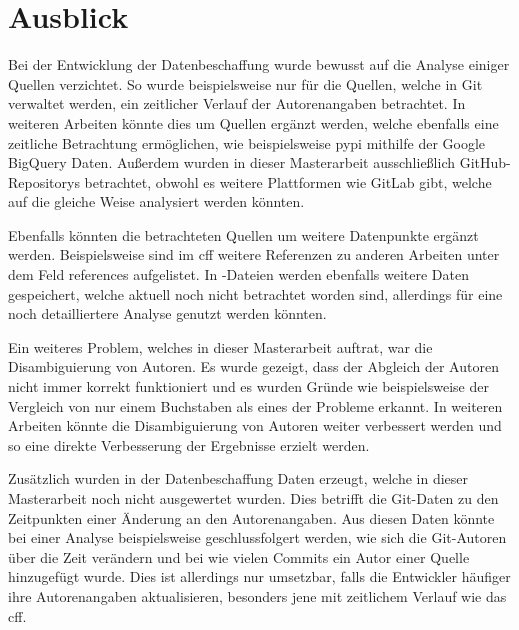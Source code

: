 \section{Ausblick}
\label{sec:ausblick}
Bei der Entwicklung der Datenbeschaffung wurde bewusst auf die Analyse einiger Quellen verzichtet.
So wurde beispielsweise nur für die Quellen, welche in Git verwaltet werden, ein zeitlicher Verlauf der Autorenangaben betrachtet.
In weiteren Arbeiten könnte dies um Quellen ergänzt werden, welche ebenfalls eine zeitliche Betrachtung ermöglichen, wie beispielsweise \gls{pypi} mithilfe der Google BigQuery Daten.
Außerdem wurden in dieser Masterarbeit ausschließlich GitHub-Repositorys betrachtet, obwohl es weitere Plattformen wie GitLab gibt, welche auf die gleiche Weise analysiert werden könnten.

Ebenfalls könnten die betrachteten Quellen um weitere Datenpunkte ergänzt werden.
Beispielsweise sind im \gls{cff} weitere Referenzen zu anderen Arbeiten unter dem Feld \glqq references\grqq{} aufgelistet.
In -Dateien werden ebenfalls weitere Daten gespeichert, welche aktuell noch nicht betrachtet worden sind, allerdings für eine noch detailliertere Analyse genutzt werden könnten.

Ein weiteres Problem, welches in dieser Masterarbeit auftrat, war die Disambiguierung von Autoren.
Es wurde gezeigt, dass der Abgleich der Autoren nicht immer korrekt funktioniert und es wurden Gründe wie beispielsweise der Vergleich von nur einem Buchstaben als eines der Probleme erkannt.
In weiteren Arbeiten könnte die Disambiguierung von Autoren weiter verbessert werden und so eine direkte Verbesserung der Ergebnisse erzielt werden.

Zusätzlich wurden in der Datenbeschaffung Daten erzeugt, welche in dieser Masterarbeit noch nicht ausgewertet wurden.
Dies betrifft die Git-Daten zu den Zeitpunkten einer Änderung an den Autorenangaben.
Aus diesen Daten könnte bei einer Analyse beispielsweise geschlussfolgert werden, wie sich die Git-Autoren über die Zeit verändern und bei wie vielen Commits ein Autor einer Quelle hinzugefügt wurde.
Dies ist allerdings nur umsetzbar, falls die Entwickler häufiger ihre Autorenangaben aktualisieren, besonders jene mit zeitlichem Verlauf wie das \gls{cff}.

